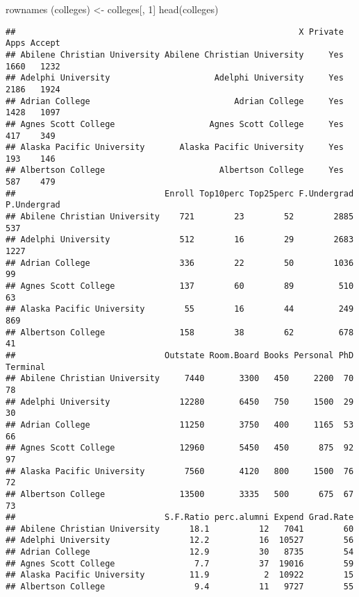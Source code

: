 \documentclass[
]{article}
\newenvironment{Shaded}{\begin{snugshade}}{\end{snugshade}}
\newcommand{\DecValTok}[1]{\textcolor[rgb]{0.00,0.00,0.81}{#1}}
\newcommand{\FunctionTok}[1]{\textcolor[rgb]{0.00,0.00,0.00}{#1}}
\newcommand{\NormalTok}[1]{#1}
\newcommand{\OtherTok}[1]{\textcolor[rgb]{0.56,0.35,0.01}{#1}}
\begin{document}
\begin{Shaded}
\begin{Highlighting}[]
\FunctionTok{rownames}\NormalTok{ (colleges) }\OtherTok{\textless{}{-}}\NormalTok{ colleges[, }\DecValTok{1}\NormalTok{]}
\FunctionTok{head}\NormalTok{(colleges)}
\end{Highlighting}
\end{Shaded}

\begin{verbatim}
##                                                         X Private Apps Accept
## Abilene Christian University Abilene Christian University     Yes 1660   1232
## Adelphi University                     Adelphi University     Yes 2186   1924
## Adrian College                             Adrian College     Yes 1428   1097
## Agnes Scott College                   Agnes Scott College     Yes  417    349
## Alaska Pacific University       Alaska Pacific University     Yes  193    146
## Albertson College                       Albertson College     Yes  587    479
##                              Enroll Top10perc Top25perc F.Undergrad P.Undergrad
## Abilene Christian University    721        23        52        2885         537
## Adelphi University              512        16        29        2683        1227
## Adrian College                  336        22        50        1036          99
## Agnes Scott College             137        60        89         510          63
## Alaska Pacific University        55        16        44         249         869
## Albertson College               158        38        62         678          41
##                              Outstate Room.Board Books Personal PhD Terminal
## Abilene Christian University     7440       3300   450     2200  70       78
## Adelphi University              12280       6450   750     1500  29       30
## Adrian College                  11250       3750   400     1165  53       66
## Agnes Scott College             12960       5450   450      875  92       97
## Alaska Pacific University        7560       4120   800     1500  76       72
## Albertson College               13500       3335   500      675  67       73
##                              S.F.Ratio perc.alumni Expend Grad.Rate
## Abilene Christian University      18.1          12   7041        60
## Adelphi University                12.2          16  10527        56
## Adrian College                    12.9          30   8735        54
## Agnes Scott College                7.7          37  19016        59
## Alaska Pacific University         11.9           2  10922        15
## Albertson College                  9.4          11   9727        55
\end{verbatim}
\end{document}
